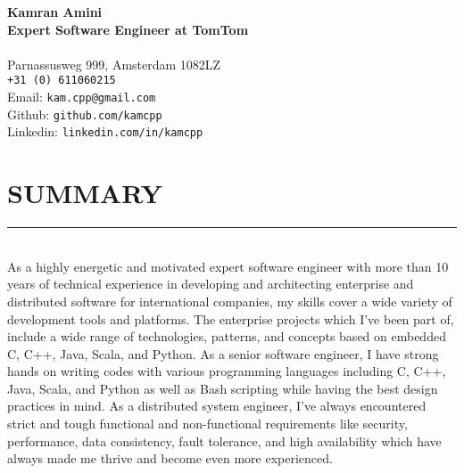 \documentclass[10pt,a4paper]{article}
\begin{document}
\noindent \textbf{Kamran Amini} \\
\noindent \small \textbf{Expert Software Engineer at TomTom} \\ \\
Parnassusweg 999, Amsterdam 1082LZ \\
\texttt{+31 (0) 611060215} \\
Email: \texttt{kam.cpp@gmail.com} \\
Github: \texttt{github.com/kamcpp} \\
Linkedin: \texttt{linkedin.com/in/kamcpp} 

\section{SUMMARY}
\noindent \rule {18.0cm}{0.2pt} \\
\normalsize As a highly energetic and motivated expert software engineer with more than 10 years of technical experience in developing and architecting enterprise and distributed software for international companies, my skills cover a wide variety of development tools and platforms. The enterprise projects which I've been part of, include a wide range of technologies, patterns, and concepts based on embedded C, C++, Java, Scala, and Python. As a senior software engineer, I have strong hands on writing codes with various programming languages including C, C++, Java, Scala, and Python as well as Bash scripting while having the best design practices in mind. As a distributed system engineer, I've always encountered strict and tough functional and non-functional requirements like security, performance, data consistency, fault tolerance, and high availability which have always made me thrive and become even more experienced.

\small
\end{document}
